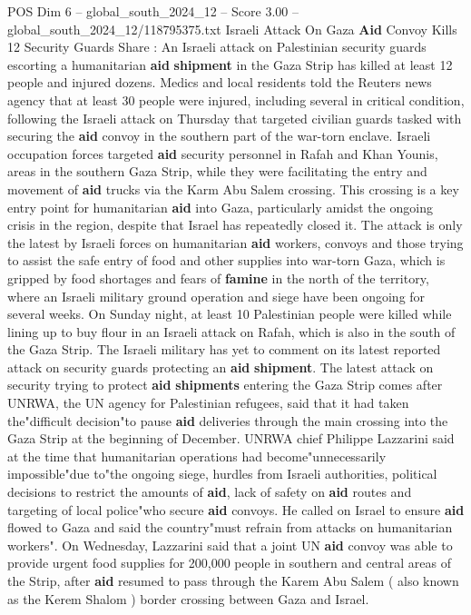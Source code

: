 \begin{textsample}{POS Dim 6 – global\_south\_2024\_12 – Score 3.00 – global\_south\_2024\_12/118795375.txt}  \label{ex:f6_pos_329}
Israeli Attack On Gaza \textbf{Aid} Convoy Kills 12 Security Guards Share : An Israeli attack on Palestinian security guards escorting a humanitarian \textbf{aid} \textbf{shipment} in the Gaza Strip has killed at least 12 people and injured dozens.
Medics and local residents told the Reuters news agency that at least 30 people were injured, including several in critical condition, following the Israeli attack on Thursday that targeted civilian guards tasked with securing the \textbf{aid} convoy in the southern part of the war-torn enclave.
Israeli occupation forces targeted \textbf{aid} security personnel in Rafah and Khan Younis, areas in the southern Gaza Strip, while they were facilitating the entry and movement of \textbf{aid} trucks via the Karm Abu Salem crossing.
This crossing is a key entry point for humanitarian \textbf{aid} into Gaza, particularly amidst the ongoing crisis in the region, despite that Israel has repeatedly closed it.
The attack is only the latest by Israeli forces on humanitarian \textbf{aid} workers, convoys and those trying to assist the safe entry of food and other supplies into war-torn Gaza, which is gripped by food shortages and fears of \textbf{famine} in the north of the territory, where an Israeli military ground operation and siege have been ongoing for several weeks.
On Sunday night, at least 10 Palestinian people were killed while lining up to buy flour in an Israeli attack on Rafah, which is also in the south of the Gaza Strip.
The Israeli military has yet to comment on its latest reported attack on security guards protecting an \textbf{aid} \textbf{shipment}.
The latest attack on security trying to protect \textbf{aid} \textbf{shipments} entering the Gaza Strip comes after UNRWA, the UN agency for Palestinian refugees, said that it had taken the"difficult decision"to pause \textbf{aid} deliveries through the main crossing into the Gaza Strip at the beginning of December.
UNRWA chief Philippe Lazzarini said at the time that humanitarian operations had become"unnecessarily impossible"due to"the ongoing siege, hurdles from Israeli authorities, political decisions to restrict the amounts of \textbf{aid}, lack of safety on \textbf{aid} routes and targeting of local police"who secure \textbf{aid} convoys.
He called on Israel to ensure \textbf{aid} flowed to Gaza and said the country"must refrain from attacks on humanitarian workers".
On Wednesday, Lazzarini said that a joint UN \textbf{aid} convoy was able to provide urgent food supplies for 200,000 people in southern and central areas of the Strip, after \textbf{aid} resumed to pass through the Karem Abu Salem ( also known as the Kerem Shalom ) border crossing between Gaza and Israel.

\end{textsample}
